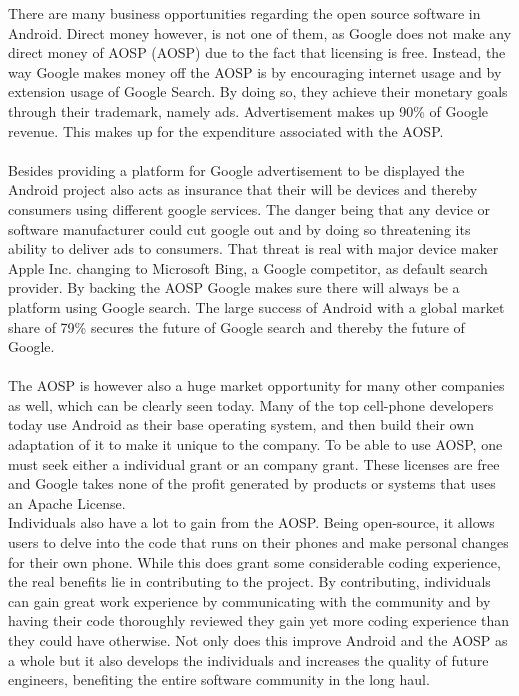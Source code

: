 \documentclass[conference]{IEEEtran}
\begin{document}
There are many business opportunities regarding the open source software in Android. Direct money however, is not one of them, as Google does not make any direct money of AOSP (AOSP) due to the fact that licensing is free.\cite{Money} Instead, the way Google makes money off the AOSP is by encouraging internet usage and by extension usage of Google Search. By doing so, they achieve their monetary goals through their trademark, namely ads. Advertisement makes up 90\% of Google revenue. \cite{google-revenue} This makes up for the expenditure associated with the AOSP. 
\\\\Besides providing a platform for Google advertisement to be displayed the Android project also acts as insurance that their will be devices and thereby consumers using different google services.\cite{moat} The danger being that any device or software manufacturer could cut google out and by doing so threatening its ability to deliver ads to consumers. That threat is real with major device maker Apple Inc. changing to Microsoft Bing, a Google competitor, as default search provider. \cite{siri-bing} By backing the AOSP Google makes sure there will always be a platform using Google search. The large success of Android with a global market share of 79\% secures the future of Google search and thereby the future of Google. \cite{android-marketshare}
\\\\The AOSP is however also a huge market opportunity for many other companies as well, which can be clearly seen today. Many of the top cell-phone developers today use Android as their base operating system, and then build their own adaptation of it to make it unique to the company. To be able to use AOSP, one must seek either a individual grant or an company grant.\cite{android-licenses} These licenses are free and Google takes none of the profit generated by products or systems that uses an Apache License.\\
Individuals also have a lot to gain from the AOSP. Being open-source, it allows users to delve into the code that runs on their phones and make personal changes for their own phone. While this does grant some considerable coding experience, the real benefits lie in contributing to the project. By contributing, individuals can gain great work experience by communicating with the community and by having their code thoroughly reviewed they gain yet more coding experience than they could have otherwise. Not only does this improve Android and the AOSP as a whole but it also develops the individuals and increases the quality of future engineers, benefiting the entire software community in the long haul. 
\end{document}
